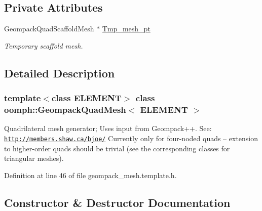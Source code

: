 \subsection*{Private Attributes}
\begin{DoxyCompactItemize}
\item 
Geompack\+Quad\+Scaffold\+Mesh $\ast$ \hyperlink{classoomph_1_1GeompackQuadMesh_a0b7edabf329aed8f4fb00eddb41b3299}{Tmp\+\_\+mesh\+\_\+pt}
\begin{DoxyCompactList}\small\item\em Temporary scaffold mesh. \end{DoxyCompactList}\end{DoxyCompactItemize}


\subsection{Detailed Description}
\subsubsection*{template$<$class E\+L\+E\+M\+E\+NT$>$\newline
class oomph\+::\+Geompack\+Quad\+Mesh$<$ E\+L\+E\+M\+E\+N\+T $>$}

Quadrilateral mesh generator; Uses input from Geompack++. See\+: \href{http://members.shaw.ca/bjoe/}{\tt http\+://members.\+shaw.\+ca/bjoe/} Currently only for four-\/noded quads -- extension to higher-\/order quads should be trivial (see the corresponding classes for triangular meshes). 

Definition at line 46 of file geompack\+\_\+mesh.\+template.\+h.



\subsection{Constructor \& Destructor Documentation}
\mbox{\label{classoomph_1_1GeompackQuadMesh_aa1de3a1b4fedf1c404d6ed5bbebfb800}} 
